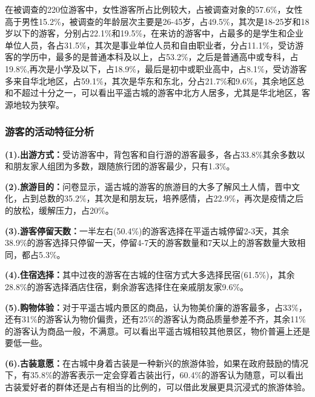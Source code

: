 \documentclass[UTF8]{ctexart}
\begin{document}
            在被调查的220位游客中，女性游客所占比例较大，占被调查对象的57.6\%，女性高于男性15.2\%，被调查的年龄层次主要是26-45岁，占49.5\%，其次是18-25岁和18岁以下的游客，分别占22.1\%和19.5\%，在来访的游客中，占最多的是学生和企业单位人员，各占31.5\%，其次是事业单位人员和自由职业者，分占11.1\%，受访游客的学历中，最多的是普通本科及以上，占53.2\%，之后是普通高中或专科，占19.8\%,再次是小学及以下，占18.9\%，最后是初中或职业高中，占8.1\%，受访游客多来自华北地区，占59.1\%，其次是华东和东北，分占21.7\%和9.6\%，其余地区总和不超过十分之一，可以看出平遥古城的游客中北方人居多，尤其是华北地区，客源地较为狭窄。   
        \subsubsection{游客的活动特征分析}
            \textbf{(1).出游方式：}受访游客中，背包客和自行游的游客最多，各占33.8\%其余多数以和朋友家人组团为多数，跟随旅行团的游客最少，只有1.3\%。
            
            \textbf{(2).旅游目的：}问卷显示，遥古城的游客的旅游目的大多了解风土人情，晋中文化，占到总数的35.2\%，其次是和朋友玩，培养感情，占22.9\%，再次是疫情之后的放松，缓解压力，占20\%。
            
            \textbf{(3).游客停留天数：}一半左右(50.4\%)的游客选择在平遥古城停留2-3天，其余38.9\%的游客选择只停留一天，停留4-7天的游客数量和7天以上的游客数量大致相同，都占5.3\%。
            
            \textbf{(4).住宿选择：}其中过夜的游客在古城的住宿方式大多选择民宿(61.5\%)，其余28.8\%的游客选择酒店住宿，剩余游客选择住在亲戚朋友家9.6\%。
            
            \textbf{(5).购物体验：}对于平遥古城内景区的商品，认为物美价廉的游客最多，占33\%，还有31\%的游客认为物价偏贵，还有25\%的游客认为商品质量参差不齐，其余11\%的游客认为商品一般，不满意。可以看出平遥古城相较其他景区，物价普遍上还是要低一些。
            
            \textbf{(6).古装意愿：}在古城中身着古装是一种新兴的旅游体验，如果在政府鼓励的情况下，有35.8\%的游客表示一定会穿着古装出行，60.4\%的游客认为随意，可以看出古装爱好者的群体还是占有相当的比例的，可以借此发展更具沉浸式的旅游体验。
\end{document}
